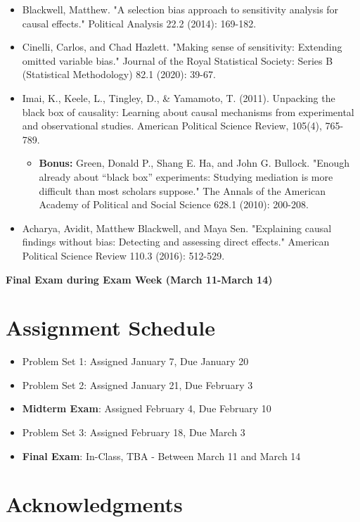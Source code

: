 \documentclass[11pt, article, oneside]{memoir}
\theoremstyle{Assumption}
\begin{document}
\begin{itemize}
\item Blackwell, Matthew. "A selection bias approach to sensitivity analysis for causal effects." Political Analysis 22.2 (2014): 169-182.
\item Cinelli, Carlos, and Chad Hazlett. "Making sense of sensitivity: Extending omitted variable bias." Journal of the Royal Statistical Society: Series B (Statistical Methodology) 82.1 (2020): 39-67.
\item Imai, K., Keele, L., Tingley, D., \& Yamamoto, T. (2011). Unpacking the black box of causality: Learning about causal mechanisms from experimental and observational studies. American Political Science Review, 105(4), 765-789.
\begin{itemize}
\item \textbf{Bonus:} Green, Donald P., Shang E. Ha, and John G. Bullock. "Enough already about “black box” experiments: Studying mediation is more difficult than most scholars suppose." The Annals of the American Academy of Political and Social Science 628.1 (2010): 200-208.
\end{itemize}
\item Acharya, Avidit, Matthew Blackwell, and Maya Sen. "Explaining causal findings without bias: Detecting and assessing direct effects." American Political Science Review 110.3 (2016): 512-529.
\end{itemize}


\textbf{Final Exam during Exam Week (March 11-March 14)}

\section*{Assignment Schedule}

\begin{itemize}
\item Problem Set 1: Assigned January 7, Due January 20
\item Problem Set 2: Assigned January 21, Due February 3
\item \textbf{Midterm Exam}: Assigned February 4, Due February 10
\item Problem Set 3: Assigned February 18, Due March 3
\item \textbf{Final Exam}: In-Class, TBA - Between March 11 and March 14
\end{itemize}

\section*{Acknowledgments}
\end{document}

